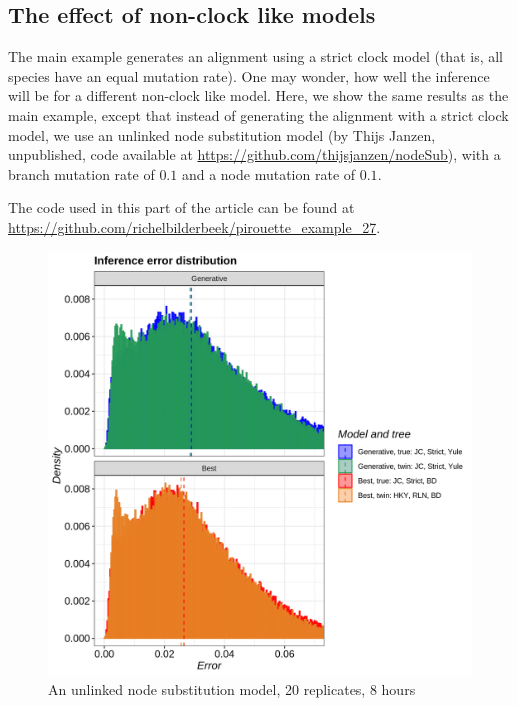 \subsection{The effect of non-clock like models}
\label{subsec:non_clock}

The main example generates an alignment using a strict clock model (that is,
all species have an equal mutation rate).
One may wonder, how well the inference will be for a different non-clock like
model.
Here, we show the same results as the main example,
except that instead of generating the alignment with a strict clock
model, we use an unlinked node substitution model (by Thijs Janzen,
unpublished, code available at \url{https://github.com/thijsjanzen/nodeSub}),
with a branch mutation rate of $0.1$ and a node mutation rate of $0.1$.

The code used in this part of the article can be found at 
\url{https://github.com/richelbilderbeek/pirouette_example_27}.

\begin{figure}[H]
  \includegraphics[width=\textwidth]{pirouette_example_27/errors.png}
  \caption{An unlinked node substitution model, 20 replicates, 8 hours}
\end{figure}

